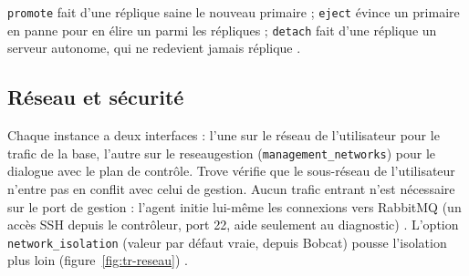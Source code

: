 \texttt{promote} fait d'une réplique saine le nouveau primaire ; \texttt{eject} évince un primaire en panne pour en élire un parmi les
répliques ; \texttt{detach} fait d'une réplique un serveur autonome, qui ne redevient jamais réplique \parencite{trove-replication}.

\subsection{Réseau et sécurité}\label{sec:tr-secu}

Chaque instance a deux interfaces : l'une sur le réseau de l'utilisateur pour le trafic de la base, l'autre sur le
\gls{reseaugestion} (\texttt{management\_\allowbreak networks}) pour le dialogue avec le plan de contrôle. Trove vérifie que le sous-réseau de
l'utilisateur n'entre pas en conflit avec celui de gestion. Aucun trafic entrant n'est nécessaire sur le port de gestion : l'agent
initie lui-même les connexions vers RabbitMQ (un accès SSH depuis le contrôleur, port 22, aide seulement au diagnostic)
\parencite{trove-production}. L'option \texttt{network\_isolation} (valeur par défaut vraie, depuis Bobcat) pousse l'isolation plus
loin (figure~\ref{fig:tr-reseau}) \parencite{trove-netiso}.

